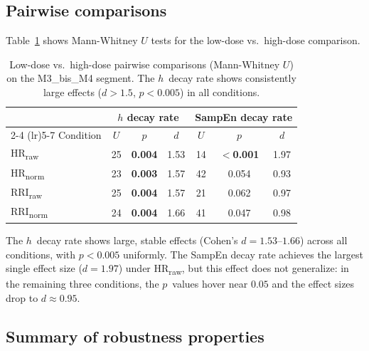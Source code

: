 \documentclass[12pt,a4paper]{article}
\begin{document}
\subsection{Pairwise comparisons}\label{sec:pairwise}

Table~\ref{tab:pairwise} shows Mann-Whitney $U$ tests for the low-dose vs.\ high-dose comparison.

\begin{table}[htbp]
\centering
\caption{Low-dose vs.\ high-dose pairwise comparisons (Mann-Whitney $U$)
on the M3\_bis\_M4 segment.
The $h$~decay rate shows consistently large effects ($d > 1.5$, $p < 0.005$) in all conditions.}\label{tab:pairwise}
\small
\begin{tabular}{l ccc ccc}
\toprule
& \multicolumn{3}{c}{$h$ decay rate} & \multicolumn{3}{c}{SampEn decay rate} \\
\cmidrule(lr){2-4} \cmidrule(lr){5-7}
Condition & $U$ & $p$ & $d$ & $U$ & $p$ & $d$ \\
\midrule
HR\textsubscript{raw}  & 25 & \textbf{0.004} & 1.53 & 14 & \textbf{$<$0.001} & 1.97 \\
HR\textsubscript{norm} & 23 & \textbf{0.003} & 1.57 & 42 & 0.054               & 0.93 \\
RRI\textsubscript{raw} & 25 & \textbf{0.004} & 1.57 & 21 & 0.062               & 0.97 \\
RRI\textsubscript{norm}& 24 & \textbf{0.004} & 1.66 & 41 & 0.047               & 0.98 \\
\bottomrule
\end{tabular}
\end{table}

The $h$~decay rate shows large, stable effects (Cohen's $d = 1.53$--$1.66$) across all conditions, with $p < 0.005$ uniformly.
The SampEn decay rate achieves the largest single effect size ($d = 1.97$) under HR\textsubscript{raw}, but this effect does not generalize: in the remaining three conditions, the $p$~values hover near $0.05$ and the effect sizes drop to $d \approx 0.95$.

\subsection{Summary of robustness properties}\label{sec:summary}
\end{document}
